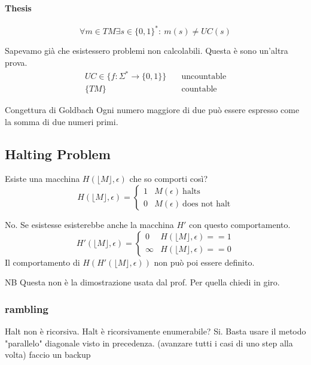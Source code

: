 \documentclass{article}
\newcommand{\floor}[1]{\ensuremath{\lfloor #1 \rfloor}}
\begin{document}
\paragraph{Thesis}
\[
    \forall m\in TM \exists s \in \{0,1\}^*:\ m(s)\neq UC(s)
\] 

\begin{callout}{}
    Sapevamo già che esistessero problemi non calcolabili. Questa è sono un'altra prova.
    \begin{align*}
        UC\in\{f:\Sigma^*\to\{0,1\}\} &\quad \text{uncountable} \\
        \{TM\} &\quad \text{countable}
    \end{align*}
\end{callout}

\begin{callout}{Congettura di Goldbach}
    Ogni numero maggiore di due può essere espresso come la somma di due numeri primi.
\end{callout}

\subsection{Halting Problem}
Esiste una macchina $H(\floor{M},\epsilon)$ che so comporti così?
$$
H(\floor{M},\epsilon) = \begin{cases}
    1 & M(\epsilon)\ \text{halts} \\
    0 & M(\epsilon)\ \text{does not halt} 
\end{cases}
$$

No. Se esistesse esisterebbe anche la macchina $H'$ con questo comportamento.
$$
H'(\floor{M},\epsilon) = \begin{cases}
    0 & H(\floor{M},\epsilon)==1 \\
    \infty & H(\floor{M},\epsilon)==0
\end{cases}
$$
Il comportamento di $H(H'(\floor{M},\epsilon))$ non può poi essere definito.

\begin{warning}{NB}
    Questa non è la dimostrazione usata dal prof. Per quella chiedi in giro.
\end{warning}

\subsubsection{rambling}
Halt non è ricorsiva. Halt è ricorsivamente enumerabile? Si. Basta usare il metodo "parallelo" diagonale visto in precedenza. (avanzare tutti i casi di uno step alla volta)
faccio un backup
\end{document}
